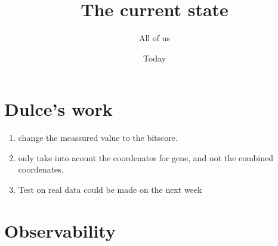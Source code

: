 \documentclass[11pt]{article}
\begin{document}
\title{The current state}
\author{All of us}
\date{Today}
\maketitle

\section{Dulce's work}

\begin{enumerate}
\item change the meassured value to the bitscore.
\item only take into acount the coordenates for gene, and not the combined coordenates.
\item Test on real data could be made on the next week
\end{enumerate}

\section{Observability}
\end{document}
